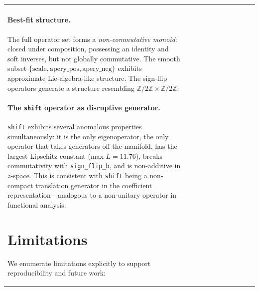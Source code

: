 \documentclass[11pt,a4paper]{article}
\begin{document}
\begin{table}[h]
\begin{tabular}{l|cccccccccc}
\paragraph{Best-fit structure.}
The full operator set forms a \emph{non-commutative monoid}: closed under
composition, possessing an identity and soft inverses, but not globally
commutative.  The smooth subset
$\{\mathrm{scale}, \mathrm{apery\_pos}, \mathrm{apery\_neg}\}$ exhibits
approximate Lie-algebra-like structure.  The sign-flip operators generate a
structure resembling $\mathbb{Z}/2\mathbb{Z} \times \mathbb{Z}/2\mathbb{Z}$.

\paragraph{The \texttt{shift} operator as disruptive generator.}
\texttt{shift} exhibits several anomalous properties simultaneously: it is
the only eigenoperator, the only operator that takes generators off the
manifold, has the largest Lipschitz constant (max $L = 11.76$), breaks
commutativity with \texttt{sign\_flip\_b}, and is non-additive in $z$-space.
This is consistent with \texttt{shift} being a non-compact translation
generator in the coefficient representation---analogous to a non-unitary
operator in functional analysis.

\section{Limitations}
\label{sec:limitations}

We enumerate limitations explicitly to support reproducibility and future work:


\end{tabular}
\end{table}
\end{document}
